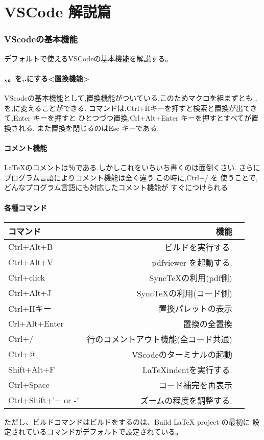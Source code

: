 \documentclass{ltjsarticle}
\begin{document}
\part{VSCode 解説篇}
\section{VScodeの基本機能}
デフォルトで使えるVSCodeの基本機能を解説する。
\subsection{、。を,.にする<置換機能>}
VScodeの基本機能として,置換機能がついている.このためマクロを組まずとも
,を,に変えることができる.
コマンドは,Ctrl+Hキーを押すと検索と置換が出てきて,Enter キーを押すと
ひとつづつ置換,Crl+Alt+Enter キーを押すとすべてが置換される.
また置換を閉じるのはEsc キーである.
\subsection{コメント機能}
\LaTeX のコメントは％である.しかしこれをいちいち書くのは面倒くさい.
さらにプログラム言語によりコメント機能は全く違う.この時に,Ctrl+/ を
使うことで,どんなプログラム言語にも対応したコメント機能が
すぐにつけられる
\subsection{各種コマンド}
\begin{center}
  \begin{tabular}{lrr} \hline
    コマンド            & 機能                  \\ \hline
    Ctrl+Alt+B          & ビルドを実行する.           \\
    Ctrl+Alt+V          & pdfviewer を起動する.    \\
    Ctrl+click          & SyncTeXの利用(pdf側)    \\
    Ctrl+Alt+J          & SyncTeXの利用(コード側)    \\
    Ctrl+Hキー            & 置換パレットの表示           \\
    Crl+Alt+Enter       & 置換の全置換              \\
    Ctrl+/              & 行のコメントアウト機能(全コード共通) \\
    Ctrl+@              & VScodeのターミナルの起動     \\
    Shift+Alt+F         & LaTeXindentを実行する.\\
    Ctrl+Space          & コード補完を再表示\\
    Ctrl+Shift+'+ or -' & ズームの程度を調整する.        \\ \hline
  \end{tabular}
\end{center}
ただし、ビルドコマンドはビルドをするのは、Build LaTeX project の最初に
設定されているコマンドがデフォルトで設定されている。
\end{document}
